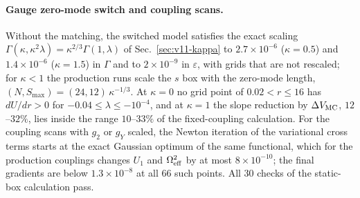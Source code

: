 \paragraph{Gauge zero-mode switch and coupling scans.}
Without the matching, the switched model satisfies the exact scaling $\Gamma(\kappa,\kappa^2\lambda)=\kappa^{2/3}\Gamma(1,\lambda)$ of Sec.~\ref{sec:v11-kappa} to $2.7\times10^{-6}$ ($\kappa=0.5$) and $1.4\times10^{-6}$ ($\kappa=1.5$) in $\Gamma$ and to $2\times10^{-9}$ in $\varepsilon$, with grids that are not rescaled; for $\kappa<1$ the production runs scale the $s$ box with the zero-mode length, $(N,S_{\max})=(24,12)\,\kappa^{-1/3}$. %
At $\kappa=0$ no grid point of $0.02<r\le16$ has $dU/dr>0$ for $-0.04\le\lambda\le-10^{-4}$, and at $\kappa=1$ the slope reduction by $\Delta V_{\rm MC}$, $12$--$32\%$, lies inside the range $10$--$33\%$ of the fixed-coupling calculation. %
For the coupling scans with $g_2$ or $g_Y$ scaled, the Newton iteration of the variational cross terms starts at the exact Gaussian optimum of the same functional, which for the production couplings changes $U_1$ and $\Omega_{\rm eff}^2$ by at most $8\times10^{-10}$; the final gradients are below $1.3\times10^{-8}$ at all 66 such points. %
All $30$ checks of the static-box calculation pass. %


